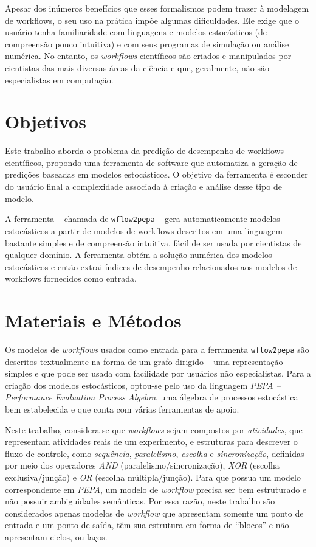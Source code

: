 \documentclass[a4paper,10pt]{article}
\begin{document}
        Apesar dos inúmeros benefícios que esses formalismos podem trazer à modelagem de workflows, o seu uso na prática impõe algumas dificuldades.  Ele exige que o usuário tenha familiaridade com linguagens e modelos estocásticos (de compreensão pouco intuitiva) e com seus programas de simulação ou análise numérica. No entanto, os \emph{workflows} científicos são criados e manipulados por cientistas das mais diversas áreas da ciência e que, geralmente, não são especialistas em computação.

    \section*{Objetivos}

	Este trabalho aborda o problema da predição de desempenho de workflows científicos, propondo uma ferramenta de software que automatiza a geração de predições baseadas em modelos estocásticos. O objetivo da ferramenta é esconder do usuário final a complexidade associada à criação e análise desse tipo de modelo.

	 A ferramenta -- chamada de \texttt{wflow2pepa} -- gera automaticamente modelos estocásticos a partir de modelos de workflows descritos em uma linguagem bastante simples e de compreensão intuitiva, fácil de ser usada por cientistas de qualquer domínio. A ferramenta obtém a solução numérica dos modelos estocásticos e então extrai índices de desempenho relacionados aos modelos de workflows fornecidos como entrada.

    \section*{Materiais e Métodos}

        Os modelos de \emph{workflows} usados como entrada para a ferramenta \texttt{wflow2pepa} são descritos textualmente na forma de um grafo dirigido -- uma representação simples e que pode ser usada com facilidade por usuários não especialistas.
		Para a criação dos modelos estocásticos, optou-se pelo uso da linguagem \emph{PEPA -- Performance Evaluation Process Algebra}, uma álgebra de processos estocástica bem estabelecida e que conta com várias ferramentas de apoio.

         Neste trabalho, considera-se que \emph{workflows} sejam compostos por \emph{atividades}, que representam atividades reais de um experimento, e estruturas para descrever o fluxo de controle, como \emph{sequência}, \emph{paralelismo}, \emph{escolha} e \emph{sincronização}, definidas por meio dos operadores \emph{AND} (paralelismo/sincronização), \emph{XOR} (escolha exclusiva/junção) e \emph{OR} (escolha múltipla/junção).
        Para que possua um modelo correspondente em \emph{PEPA}, um modelo de \emph{workflow} precisa ser bem estruturado e não possuir ambiguidades semânticas. Por essa razão, neste trabalho são considerados apenas modelos de \emph{workflow} que apresentam somente um ponto de entrada e um ponto de saída, têm sua estrutura em forma de ``blocos'' e não apresentam ciclos, ou laços.
\end{document}
